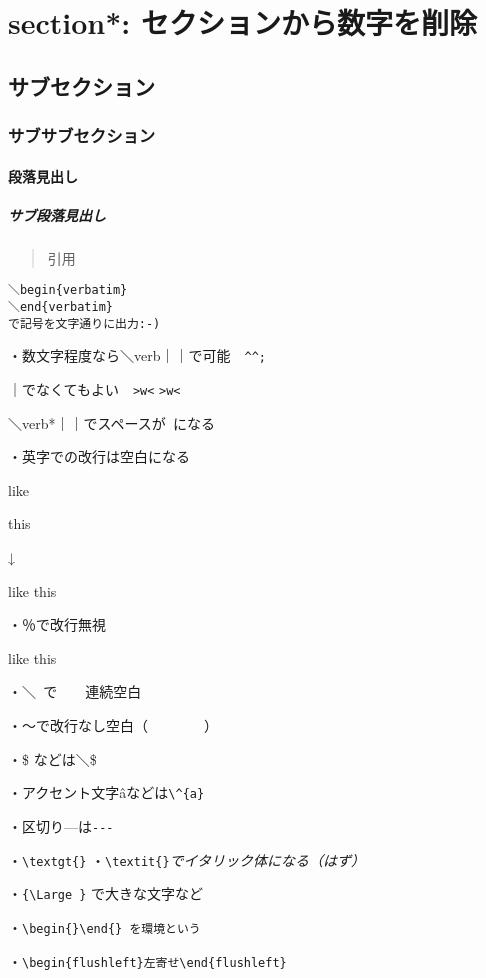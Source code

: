 \documentclass[a4paper,12pt,papersize,twocolumn,titlepage]{jsarticle}
\begin{document}
\section*{section*: セクションから数字を削除}
\subsection{サブセクション}
\subsubsection{サブサブセクション}
\paragraph{段落見出し}
\subparagraph{サブ段落見出し}
\begin{quotation}
  引用
\end{quotation}

\begin{verbatim}
＼begin{verbatim}
＼end{verbatim}
で記号を文字通りに出力:-)
\end{verbatim}

・数文字程度なら＼verb｜｜で可能　\verb|^^;|

｜でなくてもよい　\verb">w<" \verb->w<-

＼verb*｜｜でスペースが\verb*" "になる


・英字での改行は空白になる

like

this

↓

like
this


・％で改行無視

like%
this


・＼\verb*" "で\ \ \ \ 連続空白


・～で改行なし空白（~~~~~~~~）


・\$ などは＼\$


・アクセント文字\^{a}などは\verb"\^{a}"


・区切り---は\verb"---"


・\verb"\textgt{}"
・\verb"\textit{}"\textit{でイタリック体になる（はず）}

・\verb*"{\Large }" で{\Large 大きな}文字など


・\verb"\begin{}\end{} を環境という"


・\verb"\begin{flushleft}左寄せ\end{flushleft}"
\end{document}
